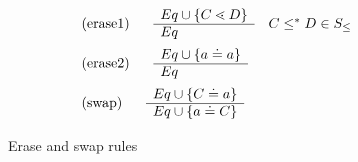 \begin{figure}
\begin{align*}
&\begin{tabular}[t]{ll}
      (erase1)  & $ 
      \begin{array}[c]{ll}
        \begin{array}[c]{l}
          Eq \cup \set{C \lessdot D}\\
          \hline
          Eq
        \end{array}
        & C \leq^* D \in S_\leq
      \end{array}$\\
          \end{tabular}\\
&\begin{tabular}[t]{ll}
      (erase2)  & $ 
      \begin{array}[c]{ll}
        \begin{array}[c]{l}
          Eq \cup \set{a \doteq a}\\
          \hline
          Eq
        \end{array}
      \end{array}$\\
          \end{tabular}\\
    &      \begin{tabular}[t]{ll}
       (swap) & $
            \begin{array}[c]{ll}
              \begin{array}[c]{l}
                Eq \cup \set{C \doteq a}\\
                \hline
                Eq \cup \set{a \doteq C}
              \end{array}
            \end{array}$
          \end{tabular}
\end{align*}
\caption{Erase and swap rules}\label{fig:fgjerase-rules}
\end{figure}